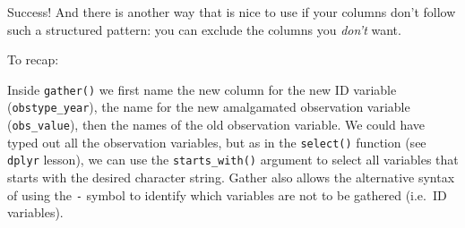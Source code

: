 \documentclass[]{book}
\newenvironment{Shaded}{\begin{snugshade}}{\end{snugshade}}
\newcommand{\KeywordTok}[1]{\textcolor[rgb]{0.13,0.29,0.53}{\textbf{#1}}}
\newcommand{\DataTypeTok}[1]{\textcolor[rgb]{0.13,0.29,0.53}{#1}}
\newcommand{\StringTok}[1]{\textcolor[rgb]{0.31,0.60,0.02}{#1}}
\newcommand{\OperatorTok}[1]{\textcolor[rgb]{0.81,0.36,0.00}{\textbf{#1}}}
\newcommand{\NormalTok}[1]{#1}
\theoremstyle{definition}
\theoremstyle{definition}
\theoremstyle{definition}
\theoremstyle{remark}
\begin{document}
\begin{Shaded}
\end{Shaded}

Success! And there is another way that is nice to use if your columns
don't follow such a structured pattern: you can exclude the columns you
\emph{don't} want.

\begin{Shaded}
\end{Shaded}

To recap:

Inside \texttt{gather()} we first name the new column for the new ID
variable (\texttt{obstype\_year}), the name for the new amalgamated
observation variable (\texttt{obs\_value}), then the names of the old
observation variable. We could have typed out all the observation
variables, but as in the \texttt{select()} function (see \texttt{dplyr}
lesson), we can use the \texttt{starts\_with()} argument to select all
variables that starts with the desired character string. Gather also
allows the alternative syntax of using the \texttt{-} symbol to identify
which variables are not to be gathered (i.e.~ID variables).
\end{document}

